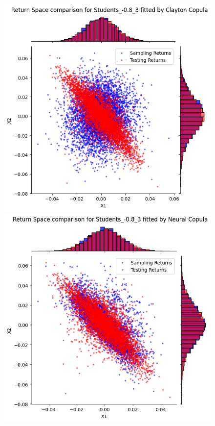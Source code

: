 \documentclass[%
a4paper,							
11pt,								
bibliography=totoc,						
abstracton=true					
]
{scrartcl}
\theoremstyle{plain}
\theoremstyle{definition}
\theoremstyle{remark}
\newcommand{\1}{\mathbbm{1}}
\begin{document}
\begin{figure}[H]
\begin{minipage}{0.4\textwidth}
    \end{minipage}
    \vfill
    \begin{minipage}{0.4\textwidth}
        \centering
        \includegraphics[width=\textwidth]{5ResultsDiscussion/pictures/PortfolioTest/ResultPortfolio3Clayton.png}
    \end{minipage}
    \hfill
    \begin{minipage}{0.4\textwidth}
        \centering
        \includegraphics[width=\textwidth]{5ResultsDiscussion/pictures/PortfolioTest/ResultPortfolio3Neural.png}

\end{minipage}
\end{figure}
\end{document}
